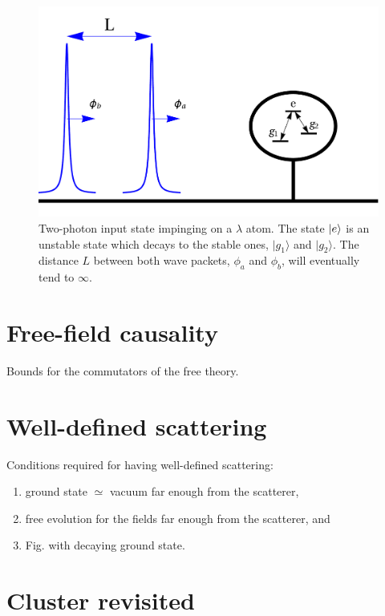 \documentclass[aps,pra,reprint,amsmath,amssymb]{revtex4-1}
\begin{document}
\begin{figure}
\includegraphics[scale=0.25]{input.pdf}
\caption{Two-photon input state impinging on a $\lambda$ atom. The state $\ket{e}$ is an unstable state which decays to the stable ones, $|g_1\rangle$ and $|g_2\rangle$. The distance $L$ between both wave packets, $\phi_a$ and $\phi_b$, will eventually tend to $\infty$.}
\label{fig:input}
\end{figure}

\section{Free-field causality}

{\color{blue}Bounds for the commutators of the free theory.}

\section{Well-defined scattering}

{\color{blue}Conditions required for having well-defined scattering:

\begin{enumerate}
\item ground state $\simeq$ vacuum far enough from the scatterer,
\item free evolution for the fields far enough from the scatterer, and
\item Fig. with decaying ground state.
\end{enumerate}
}

\section{Cluster revisited}
\end{document}
